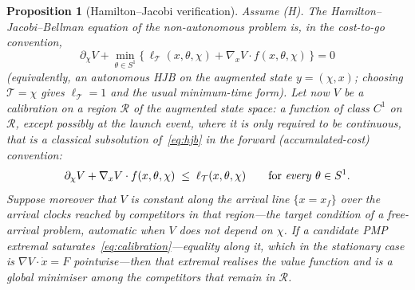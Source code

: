 \documentclass[12pt]{iopart}
\theoremstyle{plain}
\newtheorem{proposition}[theorem]{Proposition}
\theoremstyle{definition}
\theoremstyle{plain}
\theoremstyle{remark}
\newcommand{\Ithm}[1]{\setcounter{theorem}{\numexpr#1-1\relax}}
\begin{document}
\Ithm{3}
\begin{proposition}[Hamilton--Jacobi verification]\label{prop:hjb}
Assume (H). The Hamilton--Jacobi--Bellman equation of the non-autonomous problem is, in
the cost-to-go convention,
\begin{equation}
  \partial_\chi V+\min_{\theta\in S^1}\big\{\,\ell_{\mathcal T}(x,\theta,\chi)
  +\nabla_x V\cdot f(x,\theta,\chi)\,\big\}=0
  \label{eq:hjb}
\end{equation}
(equivalently, an autonomous HJB on the augmented state $y=(\chi,x)$; choosing
$\mathcal T=\chi$ gives $\ell_{\mathcal T}=1$ and the usual minimum-time form).
Let now $V$ be a \emph{calibration} on a region $\mathcal R$ of the augmented state
space: a function of class $C^1$ on $\mathcal R$, except possibly at the launch event,
where it is only required to be continuous, that is a classical subsolution
of~\eqref{eq:hjb} in the forward (accumulated-cost) convention:
\begin{equation}
  \partial_\chi V+\nabla_x V\cdot f(x,\theta,\chi)\;\le\;\ell_{\mathcal T}(x,\theta,\chi)
  \qquad\text{for \emph{every} }\theta\in S^1 .
  \label{eq:calibration}
\end{equation}
Suppose moreover that $V$ is constant along the arrival line $\{x=x_f\}$ over the
arrival clocks reached by competitors in that region---the target condition of a
free-arrival problem, automatic when $V$ does not depend on $\chi$. If a candidate PMP
extremal \emph{saturates}~\eqref{eq:calibration}---equality along it, which in the
stationary case is $\nabla V\cdot\dot x=F$ pointwise---then that extremal realises the
value function and is a \emph{global} minimiser among the competitors that remain in
$\mathcal R$.
\end{proposition}
\end{document}
